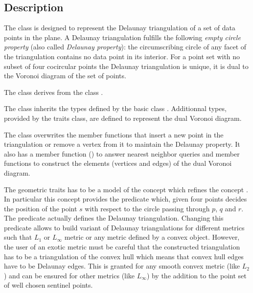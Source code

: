 \subsection{Description}
\label{Subsection_2D_Triangulations_Delaunay_Description}
The class  is designed to represent
the Delaunay triangulation of a set of data points in the plane.
A  Delaunay triangulation
fulfills
the following {\em empty circle property} 
(also called {\em Delaunay property}): the circumscribing
circle of any facet of the triangulation 
contains no data point in its interior.
For a point set with no subset of four cocircular points
the Delaunay triangulation is unique, it is  dual
to the Voronoi diagram of the set of points.

The class  derives
from the class .

The class 
inherits the types defined by the 
basic class .
Additionnal types, provided by the traits class,
are defined to represent the dual Voronoi diagram.


The class 
overwrites the member functions that insert a new point
in the triangulation 
or remove a vertex  from it
to maintain the Delaunay property.
It also has a member function ()
to answer nearest neighbor queries
and member functions to construct the elements (vertices and edges)
of the dual Voronoi diagram.

The geometric traits has to be a model of the concept
which refines the concept .
In particular this concept provides
the  predicate
which, given four points 
 decides the position of  the point $s$  with respect to the circle
passing through $p$, $q$ and $r$. 
The 
predicate actually defines the Delaunay triangulation.
Changing this predicate 
allows to build variant of Delaunay triangulations for different metrics
such that $L_1$ or $L_{\infty}$ metric or any metric defined by a
convex object. However, the user of an exotic metric
must be careful that the constructed triangulation 
has to be a triangulation of the convex hull
which means that convex hull edges have to be Delaunay edges.
This is granted for any smooth convex metric (like $L_2$)
and can be ensured for other metrics (like  $L_{\infty}$)
by the addition to the point set of well chosen sentinel points.

